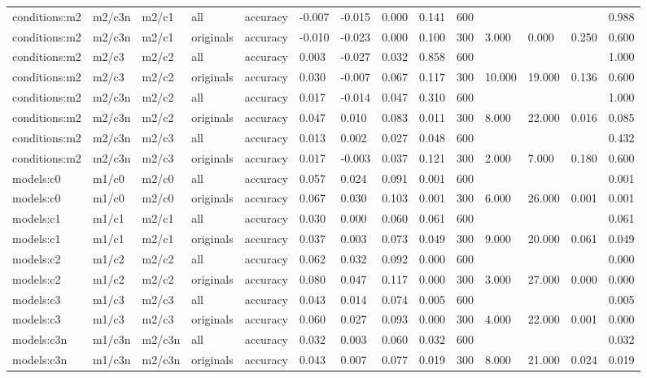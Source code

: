 \begin{tabular}{llllllllllllll}
conditions:m2 & m2/c3n & m2/c1 & all & accuracy & -0.007 & -0.015 & 0.000 & 0.141 & 600 &  &  &  & 0.988 \\
conditions:m2 & m2/c3n & m2/c1 & originals & accuracy & -0.010 & -0.023 & 0.000 & 0.100 & 300 & 3.000 & 0.000 & 0.250 & 0.600 \\
conditions:m2 & m2/c3 & m2/c2 & all & accuracy & 0.003 & -0.027 & 0.032 & 0.858 & 600 &  &  &  & 1.000 \\
conditions:m2 & m2/c3 & m2/c2 & originals & accuracy & 0.030 & -0.007 & 0.067 & 0.117 & 300 & 10.000 & 19.000 & 0.136 & 0.600 \\
conditions:m2 & m2/c3n & m2/c2 & all & accuracy & 0.017 & -0.014 & 0.047 & 0.310 & 600 &  &  &  & 1.000 \\
conditions:m2 & m2/c3n & m2/c2 & originals & accuracy & 0.047 & 0.010 & 0.083 & 0.011 & 300 & 8.000 & 22.000 & 0.016 & 0.085 \\
conditions:m2 & m2/c3n & m2/c3 & all & accuracy & 0.013 & 0.002 & 0.027 & 0.048 & 600 &  &  &  & 0.432 \\
conditions:m2 & m2/c3n & m2/c3 & originals & accuracy & 0.017 & -0.003 & 0.037 & 0.121 & 300 & 2.000 & 7.000 & 0.180 & 0.600 \\
models:c0 & m1/c0 & m2/c0 & all & accuracy & 0.057 & 0.024 & 0.091 & 0.001 & 600 &  &  &  & 0.001 \\
models:c0 & m1/c0 & m2/c0 & originals & accuracy & 0.067 & 0.030 & 0.103 & 0.001 & 300 & 6.000 & 26.000 & 0.001 & 0.001 \\
models:c1 & m1/c1 & m2/c1 & all & accuracy & 0.030 & 0.000 & 0.060 & 0.061 & 600 &  &  &  & 0.061 \\
models:c1 & m1/c1 & m2/c1 & originals & accuracy & 0.037 & 0.003 & 0.073 & 0.049 & 300 & 9.000 & 20.000 & 0.061 & 0.049 \\
models:c2 & m1/c2 & m2/c2 & all & accuracy & 0.062 & 0.032 & 0.092 & 0.000 & 600 &  &  &  & 0.000 \\
models:c2 & m1/c2 & m2/c2 & originals & accuracy & 0.080 & 0.047 & 0.117 & 0.000 & 300 & 3.000 & 27.000 & 0.000 & 0.000 \\
models:c3 & m1/c3 & m2/c3 & all & accuracy & 0.043 & 0.014 & 0.074 & 0.005 & 600 &  &  &  & 0.005 \\
models:c3 & m1/c3 & m2/c3 & originals & accuracy & 0.060 & 0.027 & 0.093 & 0.000 & 300 & 4.000 & 22.000 & 0.001 & 0.000 \\
models:c3n & m1/c3n & m2/c3n & all & accuracy & 0.032 & 0.003 & 0.060 & 0.032 & 600 &  &  &  & 0.032 \\
models:c3n & m1/c3n & m2/c3n & originals & accuracy & 0.043 & 0.007 & 0.077 & 0.019 & 300 & 8.000 & 21.000 & 0.024 & 0.019 \\
\bottomrule
\end{tabular}
